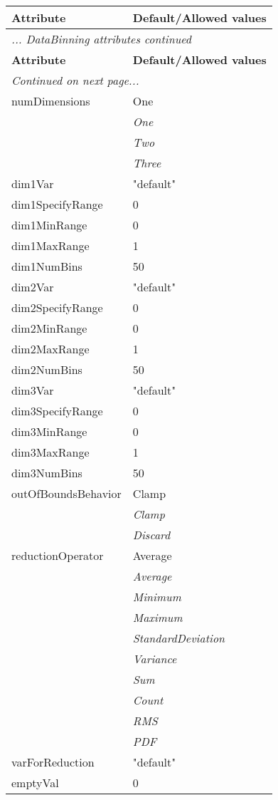 \documentclass[10pt,a4paper]{report}
\begin{document}
\begin{longtable}{ll}
{\bf Attribute} & {\bf Default/Allowed values} \\
\hline \hline
\endfirsthead
\multicolumn{2}{l}{{\it ... DataBinning attributes continued}} \\
{\bf Attribute} & {\bf Default/Allowed values} \\
\hline \hline
\endhead
\hline
\multicolumn{2}{l}{{\it Continued on next page...}} \\
\endfoot
\hline
\endlastfoot

numDimensions  &  One   \\
 & {\it  One} \\
 & {\it  Two} \\
 & {\it  Three} \\
dim1Var  &  "default" \\
dim1SpecifyRange  &  0 \\
dim1MinRange  &  0 \\
dim1MaxRange  &  1 \\
dim1NumBins  &  50 \\
dim2Var  &  "default" \\
dim2SpecifyRange  &  0 \\
dim2MinRange  &  0 \\
dim2MaxRange  &  1 \\
dim2NumBins  &  50 \\
dim3Var  &  "default" \\
dim3SpecifyRange  &  0 \\
dim3MinRange  &  0 \\
dim3MaxRange  &  1 \\
dim3NumBins  &  50 \\
outOfBoundsBehavior  &  Clamp   \\
 & {\it  Clamp} \\
 & {\it  Discard} \\
reductionOperator  &  Average   \\
 & {\it  Average} \\
 & {\it  Minimum} \\
 & {\it  Maximum} \\
 & {\it  StandardDeviation} \\
 & {\it  Variance} \\
 & {\it  Sum} \\
 & {\it  Count} \\
 & {\it  RMS} \\
 & {\it  PDF} \\
varForReduction  &  "default" \\
emptyVal  &  0 \\
\end{longtable}
\end{document}

